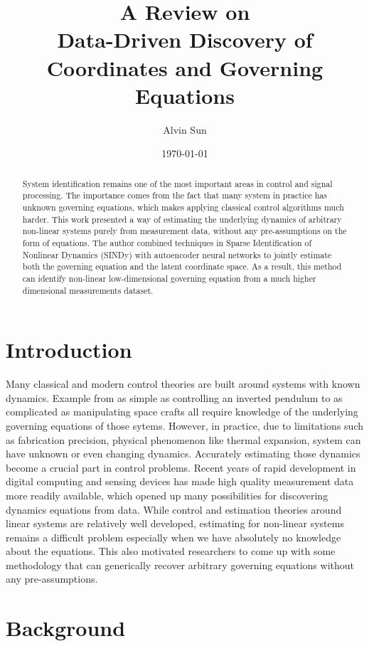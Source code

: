 \documentclass[12pt]{article}
\title{A Review on \\
  Data-Driven Discovery of Coordinates and Governing Equations \cite{Champion22445}}
\author{Alvin Sun}
\date{\today}
\begin{document}
\maketitle

\begin{abstract}
  System identification remains one of the most important areas in control and
  signal processing. The importance comes from the fact that many system in practice
  has unknown governing equations, which makes applying classical control algorithms
  much harder. This work presented a way of estimating the underlying dynamics
  of arbitrary non-linear systems purely from measurement data, without any pre-assumptions
  on the form of equations. The author combined techniques in
  Sparse Identification of Nonlinear Dynamics (SINDy) with autoencoder neural networks
  to jointly estimate both the governing equation and the latent coordinate space.
  As a result, this method can identify non-linear low-dimensional governing equation
  from a much higher dimensional measurements dataset.
\end{abstract}

\section{Introduction}

Many classical and modern control theories are built around systems with known dynamics.
Example from as simple as controlling an inverted pendulum to as complicated
as manipulating space crafts all require knowledge of the underlying governing equations
of those sytems. However, in practice, due to limitations such as fabrication precision,
physical phenomenon like thermal expansion, system can have unknown or even changing
dynamics. Accurately estimating those dynamics become a crucial part in control problems.
Recent years of rapid development in digital computing and sensing devices has made high
quality measurement data more readily available, which opened up many possibilities for
discovering dynamics equations from data. While control and estimation theories around
linear systems are relatively well developed, estimating for non-linear systems remains
a difficult problem especially when we have absolutely no knowledge about the equations.
This also motivated researchers to come up with some methodology that can generically
recover arbitrary governing equations without any pre-assumptions.

\section{Background}
\end{document}

